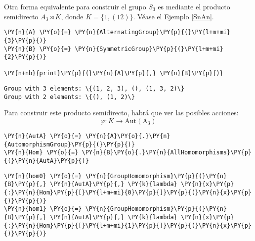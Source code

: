 \begin{enumerate}
Otra forma equivalente para construir el grupo $S_3$ es mediante el producto
semidirecto $A_3 \rtimes K$, donde $K = \{1,(12)\}$. Véase el Ejemplo \ref{SnAn}.

    \begin{tcolorbox}[breakable, size=fbox, boxrule=1pt, pad at break*=1mm,colback=cellbackground, colframe=cellborder]
\begin{Verbatim}[commandchars=\\\{\}]
\PY{n}{A} \PY{o}{=} \PY{n}{AlternatingGroup}\PY{p}{(}\PY{l+m+mi}{3}\PY{p}{)}
\PY{n}{B} \PY{o}{=} \PY{n}{SymmetricGroup}\PY{p}{(}\PY{l+m+mi}{2}\PY{p}{)}

\PY{n+nb}{print}\PY{p}{(}\PY{n}{A}\PY{p}{,} \PY{n}{B}\PY{p}{)}
\end{Verbatim}
\end{tcolorbox}


\begin{tcolorbox}[breakable, size=fbox, boxrule=.5pt, pad at break*=1mm, opacityfill=0]
    \begin{Verbatim}[commandchars=\\\{\}]
Group with 3 elements: \{(1, 2, 3), (), (1, 3, 2)\} 
Group with 2 elements: \{(), (1, 2)\}
    \end{Verbatim}
\end{tcolorbox}

Para construir este producto semidirecto, habrá que ver las posibles acciones:
\[
    \varphi \colon K \to \operatorname{Aut(A_3)}
\]


    \begin{tcolorbox}[breakable, size=fbox, boxrule=1pt, pad at break*=1mm,colback=cellbackground, colframe=cellborder]
\begin{Verbatim}[commandchars=\\\{\}]
\PY{n}{AutA} \PY{o}{=} \PY{n}{A}\PY{o}{.}\PY{n}{AutomorphismGroup}\PY{p}{(}\PY{p}{)}
\PY{n}{Hom} \PY{o}{=} \PY{n}{B}\PY{o}{.}\PY{n}{AllHomomorphisms}\PY{p}{(}\PY{n}{AutA}\PY{p}{)}
\end{Verbatim}
\end{tcolorbox}

    \begin{tcolorbox}[breakable, size=fbox, boxrule=1pt, pad at break*=1mm,colback=cellbackground, colframe=cellborder]
\begin{Verbatim}[commandchars=\\\{\}]
\PY{n}{hom0} \PY{o}{=} \PY{n}{GroupHomomorphism}\PY{p}{(}\PY{n}{B}\PY{p}{,} \PY{n}{AutA}\PY{p}{,} \PY{k}{lambda} \PY{n}{x}\PY{p}{:}\PY{n}{Hom}\PY{p}{[}\PY{l+m+mi}{0}\PY{p}{]}\PY{p}{(}\PY{n}{x}\PY{p}{)}\PY{p}{)} 
\PY{n}{hom1} \PY{o}{=} \PY{n}{GroupHomomorphism}\PY{p}{(}\PY{n}{B}\PY{p}{,} \PY{n}{AutA}\PY{p}{,} \PY{k}{lambda} \PY{n}{x}\PY{p}{:}\PY{n}{Hom}\PY{p}{[}\PY{l+m+mi}{1}\PY{p}{]}\PY{p}{(}\PY{n}{x}\PY{p}{)}\PY{p}{)}


\end{Verbatim}
\end{tcolorbox}
\end{enumerate}
